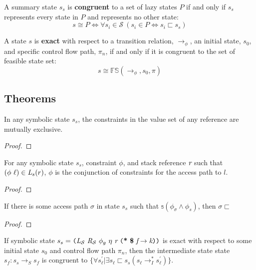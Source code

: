 \begin{definition}
\label{congruent}
A summary state $s_s$ is \textbf{congruent} to a set of lazy states $P$ if and only if $s_s$ represents every state in $P$ and represents no other state: 
$$s \cong P \Leftrightarrow \forall s_i \in \mathcal{S}\ (s_i \in P \Leftrightarrow s_i \sqsubset s_s) $$
\end{definition}

\begin{definition}
\label{exact}
A state $s$ is \textbf{exact} with respect to a transition relation, $\rightarrow_\phi$, an initial state, $s_0$, and specific control flow path, $\pi_n$, if and only if it is congruent to the set of feasible state set:
$$ s \cong \mathbb{FS}(\rightarrow_{\phi},s_0,\pi)$$
\end{definition}

\subsection{Theorems}

\begin{theorem}
\label{thm:mutex}
In any symbolic state $s_s$, the constraints in the value set of any reference are mutually exclusive.
\end{theorem}
\begin{proof}
\end{proof}

\begin{lemma}
For any symbolic state $s_s$, constraint $\phi$, and stack reference $\emph{r}$ such that $(\phi\ \ell) \in \emph{L}_s (r)$, $\phi$ is the conjunction of constraints for the access path to $l$.
\end{lemma}
\begin{proof}
\end{proof}

\begin{lemma}
If there is some access path $\sigma$ in state $s_s$ such that $\mathbb{s}(\phi_\sigma \wedge \phi_s)$, then $\sigma \sqsubset$  
\end{lemma}
\begin{proof}
\end{proof}

\begin{lemma}
\label{lem:init}
If symbolic state $s_s = \lp \cfgnt{L}_{\mathcal{S}}\ \cfgnt{R}_{\mathcal{S}}\ \phi_g\ \eta\ \cfgnt{r}\ \lp \cfgt{*}\ \cfgt{\$}\ \cfgnt{f} \rightarrow \cfgnt{k}\rp \rp$ is exact with respect to some initial state $s_0$ and control flow path $\pi_n$, then the intermediate state state $s_f : s_s \rightarrow_S s_f$ is congruent to $\{\forall s_\ell^\prime | \exists s_\ell \sqsubset s_s (s_\ell \rightarrow_I^* s_\ell^\prime)  \}$.
\end{lemma}

